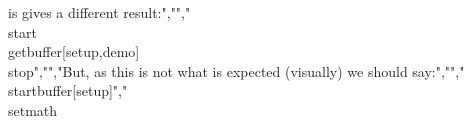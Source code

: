 is gives a different result:","","\\start\\getbuffer[setup,demo]\\stop","","But, as this is not what is expected (visually) we should say:","","\\startbuffer[setup]","\\setmath